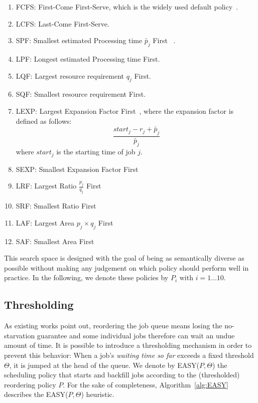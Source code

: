 \documentclass[sigconf]{acmart}
\begin{document}
\begin{enumerate}
  \item FCFS: First-Come First-Serve, which is the widely used default policy~\cite{easy}.
  \item LCFS: Last-Come First-Serve.
  \item SPF: Smallest estimated Processing time $\widetilde{p_{j}}$ First ~\cite{bfchar}.
  \item LPF: Longest estimated Processing time First.
  \item LQF: Largest resource requirement $q_j$ First.
  \item SQF: Smallest resource requirement First.
  \item LEXP: Largest Expansion Factor First~\cite{bfchar}, where the expansion
    factor is defined as follows:
  \begin{equation} \frac{start_j - r_j + \widetilde{p_j}}{\widetilde{p_j}} \end{equation}
  where $start_j$ is the starting time of job $j$.
  \item SEXP: Smallest Expansion Factor First
  \item LRF: Largest Ratio $\frac{p_j}{q_j}$ First
  \item SRF: Smallest Ratio First
  \item LAF: Largest Area $ p_j \times q_j$ First
  \item SAF: Smallest Area First
\end{enumerate}

This search space is designed with the goal of being as semantically diverse as
possible without making any judgement on which policy should perform well in
practice. In the following, we denote these policies by $P_i$ with $i = 1
\ldots 10$.

\subsection{Thresholding}
\label{sub:th}
As existing works point out, reordering the job queue means losing the
no-starvation guarantee and some individual jobs therefore can wait an undue
amount of time. It is possible to introduce a thresholding mechanism in order
to prevent this behavior: When a job's \textit{waiting time so far} exceeds a
fixed threshold $\Theta$, it is jumped at the head of the queue. We denote by
EASY($P,\Theta$) the scheduling policy that starts and backfill jobs according to
the (thresholded) reordering policy $P$. For the sake of completeness,
Algorithm~\ref{alg:EASY} describes the EASY($P,\Theta$) heuristic.
\end{document}
